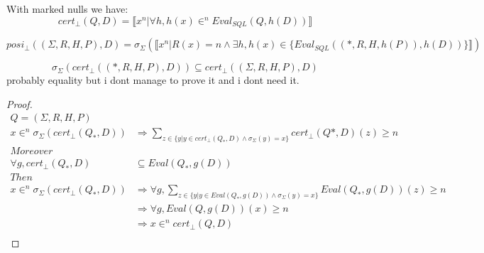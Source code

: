 \begin{mydef}
	\iffalse 
	\begin{align*}
		Eval_{SQL}(Q \setminus Q',D) & = 	Eval_{SQL}(Q,D) \setminus Eval_{SQL}(Q',D) \\
		Eval_{SQL}(Q \cup Q',D) & = 	Eval_{SQL}(Q,D) \cup Eval_{SQL}(Q',D) \\
		Eval_{SQL}(Q \uplus Q',D) & = 	Eval_{SQL}(Q,D) \uplus Eval_{SQL}(Q',D) \\
		Eval_{SQL}(Q \cap Q',D) & = 	Eval_{SQL}(Q,D) \cap Eval_{SQL}(Q',D) \\
		Eval_{SQL}(distinct(Q),D) & = 	\llbracket x^1 | x \in \{Eval_{SQL}(Q,D)\} \rrbracket \\
	\end{align*}
	\fi

\end{mydef}

\begin{mydef}
	With marked nulls we have:
	$$cert_\bot(Q,D) = \llbracket x^n | \forall h, h(x) \in^n Eval_{SQL}(Q,h(D)) \rrbracket$$
\end{mydef}

\begin{mydef}
	$$ posi_\bot((\Sigma,R,H,P),D) =  \sigma_{\Sigma}(\llbracket x^n| R(x) = n \land \exists h, h(x) \in \{Eval_{SQL}((*,R,H,h(P)),h(D))\} \rrbracket) $$
\end{mydef}

\begin{myprop}
	$$\sigma_\Sigma(cert_{\bot}((*,R,H,P),D)) \subseteq cert_{\bot}((\Sigma,R,H,P),D)$$ 
	probably equality but i dont manage to prove it and i dont need it.
\end{myprop}
\begin{proof}
	\begin{align*}
		Q = (\Sigma,R,H,P) \\
		x \in^n \sigma_\Sigma(cert_{\bot}(Q_*,D)) & \Rightarrow \sum_{z \in \{y | y \in cert_{\bot}(Q_*,D) \land \sigma_\Sigma(y) = x \} }{cert_{\bot}(Q*,D)(z)} \geq n \\
		Moreover \\
		\forall g, cert_\bot(Q_*,D) &  \subseteq Eval(Q_*,g(D)) \\
		Then \\
		x \in^n \sigma_\Sigma(cert_{\bot}(Q_*,D)) & \Rightarrow \forall g , \sum_{z \in \{y | y \in Eval(Q_*,g(D)) \land \sigma_\Sigma(y) = x \} }{Eval(Q_*,g(D)) (z)} \geq n \\
		& \Rightarrow \forall g, Eval(Q,g(D))(x) \geq n \\
		& \Rightarrow x \in^n cert_\bot(Q,D) \\
	\end{align*}
\end{proof}	

